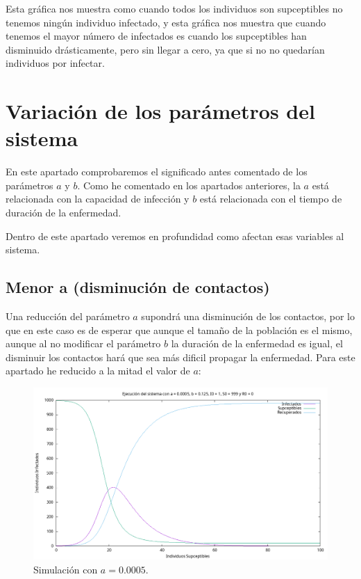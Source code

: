 \documentclass[12pt, spanish]{article}
\begin{document}
Esta gráfica nos muestra como cuando todos los individuos son supceptibles no tenemos ningún individuo infectado, y esta gráfica nos muestra que cuando tenemos el mayor número de infectados es cuando los supceptibles han disminuido drásticamente, pero sin llegar a cero, ya que si no no quedarían individuos por infectar.


\section{Variación de los parámetros del sistema}

En este apartado comprobaremos el significado antes comentado de los parámetros $a$ y $b$. Como he comentado en los apartados anteriores, la $a$ está relacionada con la capacidad de infección y $b$ está relacionada con el tiempo de duración de la enfermedad.

Dentro de este apartado veremos en profundidad como afectan esas variables al sistema.

\subsection{Menor a (disminución de contactos)}

Una reducción del parámetro $a$ supondrá una disminución de los contactos, por lo que en este caso es de esperar que aunque el tamaño de la población es el mismo, aunque al no modificar el parámetro $b$ la duración de la enfermedad es igual, el disminuir los contactos hará que sea más dificil propagar la enfermedad. Para este apartado he reducido a la mitad el valor de $a$:

\begin{figure}[H]
  \centering
      \includegraphics[width=\textwidth]{SIR_menor_a.png}
 		\caption{Simulación con $a = 0.0005$.}
\end{figure}
\end{document}

